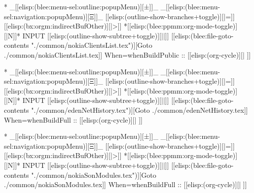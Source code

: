 


\begin{whenOrg}
*  _[[elisp:(blee:menu-sel:outline:popupMenu)][±]]_ _[[elisp:(blee:menu-sel:navigation:popupMenu)][Ξ]]_ [[elisp:(outline-show-branches+toggle)][|=]] [[elisp:(bx:orgm:indirectBufOther)][|>]] *[[elisp:(blee:ppmm:org-mode-toggle)][|N]]*  INPUT      [[elisp:(outline-show-subtree+toggle)][||]]   [[elisp:(blee:file-goto-contents "./common/nokiaClientsList.tex")][Goto ./common/nokiaClientsList.tex]] When=whenBuildPublic ::  [[elisp:(org-cycle)][| ]]
\end{whenOrg}
\begin{whenBuildPublic}

\end{whenBuildPublic}


\begin{whenOrg}
*  _[[elisp:(blee:menu-sel:outline:popupMenu)][±]]_ _[[elisp:(blee:menu-sel:navigation:popupMenu)][Ξ]]_ [[elisp:(outline-show-branches+toggle)][|=]] [[elisp:(bx:orgm:indirectBufOther)][|>]] *[[elisp:(blee:ppmm:org-mode-toggle)][|N]]*  INPUT      [[elisp:(outline-show-subtree+toggle)][||]]   [[elisp:(blee:file-goto-contents "./common/edenNetHistory.tex")][Goto ./common/edenNetHistory.tex]] When=whenBuildFull ::  [[elisp:(org-cycle)][| ]]
\end{whenOrg}
\begin{whenBuildFull}

\end{whenBuildFull}

\begin{whenOrg}
*  _[[elisp:(blee:menu-sel:outline:popupMenu)][±]]_ _[[elisp:(blee:menu-sel:navigation:popupMenu)][Ξ]]_ [[elisp:(outline-show-branches+toggle)][|=]] [[elisp:(bx:orgm:indirectBufOther)][|>]] *[[elisp:(blee:ppmm:org-mode-toggle)][|N]]*  INPUT      [[elisp:(outline-show-subtree+toggle)][||]]   [[elisp:(blee:file-goto-contents "./common/nokiaSonModules.tex")][Goto ./common/nokiaSonModules.tex]] When=whenBuildFull ::  [[elisp:(org-cycle)][| ]]
\end{whenOrg}
\begin{whenBuildFull}

\end{whenBuildFull}


